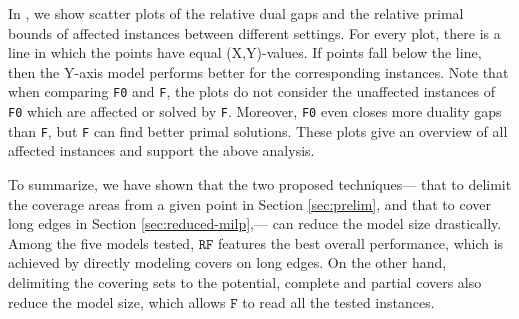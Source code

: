\documentclass[review]{elsarticle}
\theoremstyle{definition}
\begin{document}
In , we show scatter plots of the relative dual gaps and the relative primal bounds  of affected instances between different settings. For every plot, there is a line in which the points have equal (X,Y)-values. If points fall below the line, then the Y-axis model performs better for the corresponding instances. Note that when comparing  \texttt{F0} and  \texttt{F}, the plots do not consider the unaffected instances of \texttt{F0} which are affected or solved by \texttt{F}. Moreover, \texttt{F0} even closes more duality gaps than \texttt{F}, but \texttt{F} can find better primal solutions. These plots give an overview of all affected instances and support the above analysis.

To summarize, we have shown that the two proposed techniques---  that to delimit the coverage  areas from a given point in Section \ref{sec:prelim}, and that to cover long edges in Section \ref{sec:reduced-milp},--- can reduce the model size drastically. Among the five models tested, $\texttt{RF}$ features the best overall performance, which is achieved by directly modeling covers on long edges. On the other hand, delimiting the covering sets to the potential, complete and partial covers also reduce the model size, which allows $\texttt{F}$ to read all the tested instances.
\end{document}
